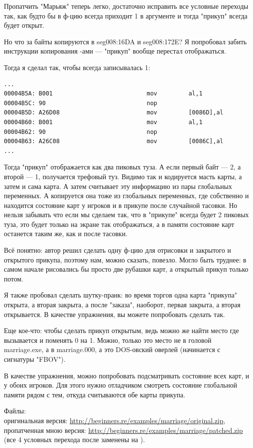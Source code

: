 Пропатчить "Марьяж" теперь легко, достаточно исправить все условные переходы так, как будто бы в ф-цию
всегда приходит 1 в аргументе и тогда "прикуп" всегда будет открыт.

Но что за байты копируются в seg008:16DA и seg008:172E?
Я попробовал забить инструкции копирования \MOV \NOP{}-ами --- "прикуп" вообще перестал отображаться.

Тогда я сделал так, чтобы всегда записывалась 1:

\begin{lstlisting}
...
00004B5A: B001                           mov         al,1
00004B5C: 90                             nop
00004B5D: A26D08                         mov         [0086D],al
00004B60: B001                           mov         al,1
00004B62: 90                             nop
00004B63: A26C08                         mov         [0086C],al
...
\end{lstlisting}

Тогда "прикуп" отображается как два пиковых туза.
А если первый байт --- 2, а второй --- 1, получается трефовый туз.
Видимо так и кодируется масть карты, а затем и сама карта.
А  затем считывает эту информацию из пары глобальных переменных.
А копируется она тоже из глобальных переменных, где собственно и находится состояние карт у игроков и в прикупе
после случайной тасовки.
Но нельзя забывать что если мы сделаем так, что в "прикупе" всегда будет 2 пиковых туза, это будет только
на экране так отображаться, а в памяти состояние карт останется таким же, как и после тасовки.

Всё понятно: автор решил сделать одну ф-цию для отрисовки и закрытого и открытого прикупа, поэтому нам, можно сказать,
повезло.
Могло быть труднее: в самом начале рисовались бы просто две рубашки карт, а открытый прикуп только потом.

Я также пробовал сделать шутку-пранк: во время торгов одна карта "прикупа" открыта, а вторая закрыта, а после "заказа",
наоборот, первая закрыта, а вторая открывается. В качестве упражнения, вы можете попробовать сделать так.

Еще кое-что: чтобы сделать прикуп открытым, ведь можно же найти место где вызывается  и поменять 0
на 1. Можно, только это место не в головой marriage.exe, а в marriage.000, а это DOS-овский оверлей (начинается
с сигнатуры "FBOV").

В качестве упражнения, можно попробовать подсматривать состояние всех карт, и у обоих игроков.
Для этого нужно отладчиком смотреть состояние глобальной памяти рядом с тем, откуда считываются обе карты
прикупа.

Файлы: \\
оригинальная версия: \url{http://beginners.re/examples/marriage/original.zip}, \\
пропатченная мною версия: \url{http://beginners.re/examples/marriage/patched.zip} 
(все 4 условных перехода после  заменены на \JMP).


